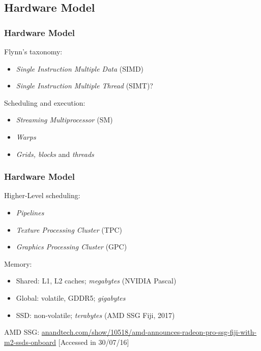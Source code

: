 \documentclass[10pt, compress]{beamer}
\begin{document}
\subsection{Hardware Model}

\begin{frame}
    \frametitle{Hardware Model}
    Flynn's taxonomy:
    \begin{itemize}
        \item \textit{Single Instruction Multiple Data} (SIMD)

        \item \textit{Single Instruction Multiple Thread} (SIMT)?
    \end{itemize}

    Scheduling and execution:
    \begin{itemize}
        \item \textit{Streaming Multiprocessor} (SM)

        \item \textit{Warps}

        \item \textit{Grids, blocks} and \textit{threads}
    \end{itemize}
\end{frame}

\begin{frame}
    \frametitle{Hardware Model}
    Higher-Level scheduling:
    \begin{itemize}
        \item \textit{Pipelines}
        \item \textit{Texture Processing Cluster} (TPC)
        \item \textit{Graphics Processing Cluster} (GPC)
    \end{itemize}

    Memory:
    \begin{itemize}
        \item Shared: L1, L2 caches; \textit{megabytes} (NVIDIA Pascal)
        \item Global: volatile, GDDR5; \textit{gigabytes}

        \item SSD: \alert{non-volatile}; \alert{\textit{terabytes}} (AMD SSG Fiji, 2017)
    \end{itemize}
    \vfill

    \tiny{AMD SSG: \url{anandtech.com/show/10518/amd-announces-radeon-pro-ssg-fiji-with-m2-ssds-onboard} [Accessed in 30/07/16]}
\end{frame}
\end{document}
